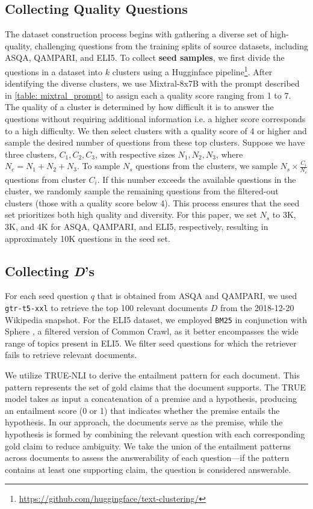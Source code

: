 \documentclass{article} %
\renewcommand{\cite}[1]{\citep{#1}}
\begin{document}
\subsection{Collecting Quality Questions} 
The dataset construction process begins with gathering a diverse set of high-quality, challenging questions from the training splits of source datasets, including ASQA, QAMPARI, and ELI5. To collect \textbf{seed samples}, we first divide the questions in a dataset into \(k\) clusters using a Hugginface pipeline\footnote{\url{https://github.com/huggingface/text-clustering/}}. After identifying the diverse clusters, we use Mixtral-8x7B with the prompt described in \cref{table: mixtral_prompt} to assign each a quality score ranging from 1 to 7. The quality of a cluster is determined by how difficult it is to answer the questions without requiring additional information i.e. a higher score corresponds to a high difficulty. We then select clusters with a quality score of 4 or higher and sample the desired number of questions from these top clusters. Suppose we have three clusters, \(C_1, C_2, C_3\), with respective sizes \(N_1, N_2, N_3\), where \(N_c = N_1 + N_2 + N_3\). To sample \(N_s\) questions from the clusters, we sample \(N_s \times \frac{C_i}{N_c}\) questions from cluster \(C_i\). If this number exceeds the available questions in the cluster, we randomly sample the remaining questions from the filtered-out clusters (those with a quality score below 4). This process ensures that the seed set prioritizes both high quality and diversity. For this paper, we set \(N_s\) to 3K, 3K, and 4K for ASQA, QAMPARI, and ELI5, respectively, resulting in approximately 10K questions in the seed set.

\subsection{Collecting \textit{D}'s}

For each seed question $q$ that is obtained from ASQA and QAMPARI, we used \texttt{gtr-t5-xxl} \cite{ni-etal-2022-large} to retrieve the top 100 relevant documents \(D\) from the 2018-12-20 Wikipedia snapshot. For the ELI5 dataset, we employed \texttt{BM25} in conjunction with Sphere \cite{piktus2021web}, a filtered version of Common Crawl, as it better encompasses the wide range of topics present in ELI5. We filter seed questions for which the retriever fails to retrieve relevant documents.

We utilize TRUE-NLI to derive the entailment pattern for each document. This pattern represents the set of gold claims that the document supports. The TRUE model takes as input a concatenation of a premise and a hypothesis, producing an entailment score (0 or 1) that indicates whether the premise entails the hypothesis. In our approach, the documents serve as the premise, while the hypothesis is formed by combining the relevant question with each corresponding gold claim to reduce ambiguity.  We take the union of the entailment patterns across documents to assess the answerability of each question—if the pattern contains at least one supporting claim, the question is considered answerable. 
\end{document}
